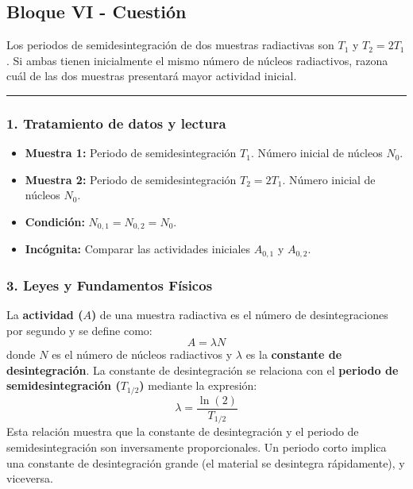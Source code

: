 \newpage

\subsection{Bloque VI - Cuestión}
\label{subsec:B6_2010_sep_ext}

\begin{cajaenunciado}
Los periodos de semidesintegración de dos muestras radiactivas son $T_1$ y $T_2 = 2T_1$. Si ambas tienen inicialmente el mismo número de núcleos radiactivos, razona cuál de las dos muestras presentará mayor actividad inicial.
\end{cajaenunciado}
\hrule

\subsubsection*{1. Tratamiento de datos y lectura}
\begin{itemize}
    \item \textbf{Muestra 1:} Periodo de semidesintegración $T_1$. Número inicial de núcleos $N_0$.
    \item \textbf{Muestra 2:} Periodo de semidesintegración $T_2 = 2T_1$. Número inicial de núcleos $N_0$.
    \item \textbf{Condición:} $N_{0,1} = N_{0,2} = N_0$.
    \item \textbf{Incógnita:} Comparar las actividades iniciales $A_{0,1}$ y $A_{0,2}$.
\end{itemize}

\subsubsection*{3. Leyes y Fundamentos Físicos}
La \textbf{actividad ($A$)} de una muestra radiactiva es el número de desintegraciones por segundo y se define como:
$$ A = \lambda N $$
donde $N$ es el número de núcleos radiactivos y $\lambda$ es la \textbf{constante de desintegración}.
La constante de desintegración se relaciona con el \textbf{periodo de semidesintegración ($T_{1/2}$)} mediante la expresión:
$$ \lambda = \frac{\ln(2)}{T_{1/2}} $$
Esta relación muestra que la constante de desintegración y el periodo de semidesintegración son inversamente proporcionales. Un periodo corto implica una constante de desintegración grande (el material se desintegra rápidamente), y viceversa.

